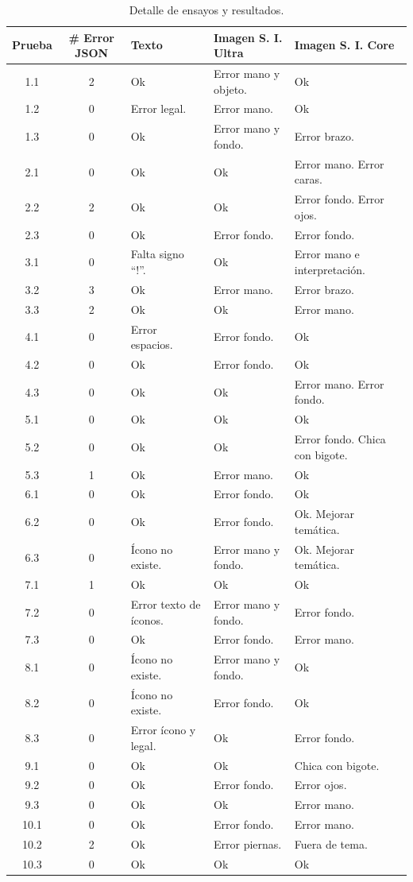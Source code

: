 \begin{table}[ht]
\centering
\scriptsize %
\caption{Detalle de ensayos y resultados.} 
\label{tabla:resultados_experimentos}
\begin{tabular}{c c l l l}
\toprule
\textbf{Prueba} & \textbf{\# Error JSON} & \textbf{Texto} & \textbf{Imagen S. I. Ultra} & \textbf{Imagen S. I. Core} \\
\midrule
1.1 & 2 & Ok & Error mano y objeto. & Ok \\
1.2 & 0 & Error legal. & Error mano. & Ok \\
1.3 & 0 & Ok & Error mano y fondo. & Error brazo. \\
2.1 & 0 & Ok & Ok & Error mano. Error caras. \\
2.2 & 2 & Ok & Ok & Error fondo. Error ojos. \\
2.3 & 0 & Ok & Error fondo. & Error fondo. \\
3.1 & 0 & Falta signo ``!''. & Ok & Error mano e interpretación. \\
3.2 & 3 & Ok & Error mano. & Error brazo. \\
3.3 & 2 & Ok & Ok & Error mano. \\
4.1 & 0 & Error espacios. & Error fondo. & Ok \\
4.2 & 0 & Ok & Error fondo. & Ok \\
4.3 & 0 & Ok & Ok & Error mano. Error fondo. \\
5.1 & 0 & Ok & Ok & Ok \\
5.2 & 0 & Ok & Ok & Error fondo. Chica con bigote. \\
5.3 & 1 & Ok & Error mano. & Ok \\
6.1 & 0 & Ok & Error fondo. & Ok \\
6.2 & 0 & Ok & Error fondo. & Ok. Mejorar temática. \\
6.3 & 0 & Ícono no existe. & Error mano y fondo. & Ok. Mejorar temática. \\
7.1 & 1 & Ok & Ok & Ok \\
7.2 & 0 & Error texto de íconos. & Error mano y fondo. & Error fondo. \\
7.3 & 0 & Ok & Error fondo. & Error mano. \\
8.1 & 0 & Ícono no existe. & Error mano y fondo. & Ok \\
8.2 & 0 & Ícono no existe. & Error fondo. & Ok \\
8.3 & 0 & Error ícono y legal. & Ok & Error fondo. \\
9.1 & 0 & Ok & Ok & Chica con bigote. \\
9.2 & 0 & Ok & Error fondo. & Error ojos. \\
9.3 & 0 & Ok & Ok & Error mano. \\
10.1 & 0 & Ok & Error fondo. & Error mano. \\
10.2 & 2 & Ok & Error piernas. & Fuera de tema. \\
10.3 & 0 & Ok & Ok & Ok \\
\bottomrule
\hline
\end{tabular}
\end{table}


